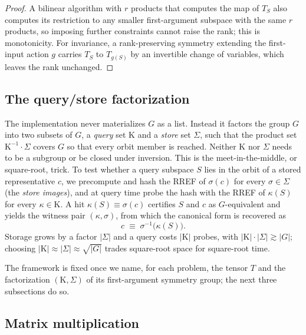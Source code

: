 \documentclass[11pt]{article}
\theoremstyle{definition}
\newcommand{\Kappa}{\mathrm{K}}
\begin{document}
\begin{proof}
  A bilinear algorithm with $r$ products that computes the map of $T_S$ also computes
  its restriction to any smaller first-argument subspace with the same $r$ products, so
  imposing further constraints cannot raise the rank; this is monotonicity. For
  invariance, a rank-preserving symmetry extending the first-input action $g$ carries
  $T_S$ to $T_{g(S)}$ by an invertible change of variables, which leaves the rank
  unchanged.
\end{proof}

\subsection{The query/store factorization}\label{sec:query-store}

The implementation never materializes $G$ as a list. Instead it factors the group $G$
into two subsets of $G$, a \emph{query} set $\Kappa$ and a \emph{store} set
$\Sigma$, such that the product set $\Kappa^{-1}\cdot\Sigma$ covers $G$ so that every
orbit member is reached. Neither $\Kappa$ nor $\Sigma$ needs to be a subgroup or be
closed under inversion. This is the meet-in-the-middle, or square-root, trick. To
test whether a query subspace $S$ lies in the orbit of a stored representative
$c$, we precompute and hash the RREF of $\sigma(c)$ for every
$\sigma\in\Sigma$ (the \emph{store images}), and at query time probe the hash with the
RREF of $\kappa(S)$ for every $\kappa\in\Kappa$. A hit $\kappa(S)\equiv \sigma(c)$
certifies $S$ and $c$ as $G$-equivalent and yields the witness pair
$(\kappa,\sigma)$, from which the canonical form is recovered as
\begin{equation}\label{eq:witness}
  c \;\equiv\; \sigma^{-1}\bigl(\kappa(S)\bigr).
\end{equation}
Storage grows by a factor $|\Sigma|$ and a query costs $|\Kappa|$
probes, with $|\Kappa|\cdot|\Sigma|\gtrsim |G|$; choosing
$|\Kappa|\approx|\Sigma|\approx\sqrt{|G|}$ trades square-root space for
square-root time.

The framework is fixed once we name, for each problem, the tensor $T$ and the
factorization $(\Kappa,\Sigma)$ of its first-argument symmetry group; the next
three subsections do so.

\subsection{Matrix multiplication}\label{sec:matrix}
\end{document}
